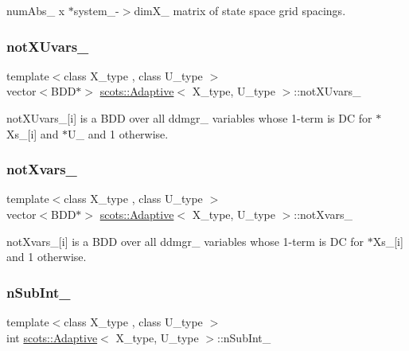num\+Abs\+\_\+ x $\ast$system\+\_\+-\/$>$dim\+X\+\_\+ matrix of state space grid spacings. \mbox{\label{classscots_1_1Adaptive_ac3f203003011bcea5176ef294ab7a8a0}} 
\subsubsection{\texorpdfstring{not\+X\+Uvars\+\_\+}{notXUvars\_}}
{\footnotesize\ttfamily template$<$class X\+\_\+type , class U\+\_\+type $>$ \\
vector$<$B\+DD$\ast$$>$ \hyperlink{classscots_1_1Adaptive}{scots\+::\+Adaptive}$<$ X\+\_\+type, U\+\_\+type $>$\+::not\+X\+Uvars\+\_\+}

not\+X\+Uvars\+\_\+\mbox{[}i\mbox{]} is a B\+DD over all ddmgr\+\_\+ variables whose 1-\/term is DC for $\ast$\+Xs\+\_\+\mbox{[}i\mbox{]} and $\ast$\+U\+\_\+ and 1 otherwise. \mbox{\label{classscots_1_1Adaptive_a8fbbf6976e589506c9e4c38045196c07}} 
\subsubsection{\texorpdfstring{not\+Xvars\+\_\+}{notXvars\_}}
{\footnotesize\ttfamily template$<$class X\+\_\+type , class U\+\_\+type $>$ \\
vector$<$B\+DD$\ast$$>$ \hyperlink{classscots_1_1Adaptive}{scots\+::\+Adaptive}$<$ X\+\_\+type, U\+\_\+type $>$\+::not\+Xvars\+\_\+}

not\+Xvars\+\_\+\mbox{[}i\mbox{]} is a B\+DD over all ddmgr\+\_\+ variables whose 1-\/term is DC for $\ast$\+Xs\+\_\+\mbox{[}i\mbox{]} and 1 otherwise. \mbox{\label{classscots_1_1Adaptive_a8279bfd4ed3ffa12cc1775ee66cf0e21}} 
\subsubsection{\texorpdfstring{n\+Sub\+Int\+\_\+}{nSubInt\_}}
{\footnotesize\ttfamily template$<$class X\+\_\+type , class U\+\_\+type $>$ \\
int \hyperlink{classscots_1_1Adaptive}{scots\+::\+Adaptive}$<$ X\+\_\+type, U\+\_\+type $>$\+::n\+Sub\+Int\+\_\+}

